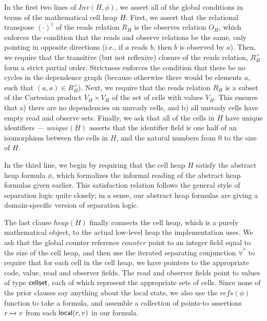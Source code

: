 In the first two lines of $Inv(H, \phi)$, we assert all of the global 
conditions in terms of the mathematical cell heap $H$. First, we assert that 
the relational transpose $(\cdot)^\dagger$ of the reads relation $R_H$ is the
observes relation $O_H$, which enforces the condition that the reads
and observe relations be the same, only pointing in opposite
directions (i.e., if $a$ reads $b$, then $b$ is observed by
$a$). Then, we require that the transitive (but not reflexive) closure
of the reads relation, $R^+_H$ form a strict partial order. Strictness
enforces the condition that there be no cycles in the dependence graph
(because otherwise there would be elements $a$, such that $(a, a) \in
R^+_H$).  Next, we require that the reads relation $R_H$ is a subset of
the Cartesian product $V_H \times V_H$ of the set of cells with values
$V_H$. This ensures that a) there are no dependencies on unready
cells, and b) all unready cells have empty read and observe
sets. Finally, we ask that all of the cells in $H$ have unique
identifiers --- $unique(H)$ asserts that the identifier field is one
half of an isomorphism between the cells in $H$, and the natural
numbers from 0 to the size of $H$.

In the third line, we begin by requiring that the cell heap $H$ satisfy
the abstract heap formula $\phi$, which formalizes the informal
reading of the abstract heap formulas given earlier. This satisfaction
relation follows the general style of separation logic quite closely; 
in a sense, our abstract heap formulas are giving a domain-specific
version of separation logic.

The last clause $heap(H)$ finally connects the cell heap, which is a
purely mathematical object, to the actual low-level heap the
implementation uses. We ask that the global counter reference
$counter$ point to an integer field equal to the size of the cell
heap, and then use the iterated separating conjunction $\forall^*$ to
require that for each cell in the cell heap, we have pointers to the
appropriate code, value, read and observer fields. The read and
observer fields point to values of type $\mathsf{cellset}$, each of which
represent the appropriate sets of cells.  Since none of the prior
clauses say anything about the local state, we also use the
$\mathit{refs}(\phi)$ function to take a formula, and assemble a
collection of points-to assertions $r \mapsto v$ from each
$\mathsf{local}({r}, {v})$ in our formula.

